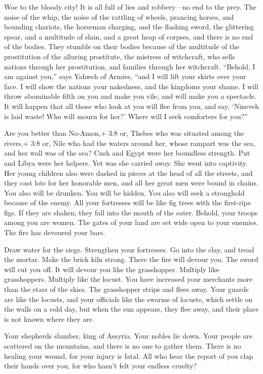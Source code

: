  Woe to the bloody city! It is all full of lies and
robbery---no end to the prey.  The noise of the whip, the
noise of the rattling of wheels, prancing horses, and bounding chariots,
 the horseman charging, and the flashing sword, the
glittering spear, and a multitude of slain, and a great heap of corpses,
and there is no end of the bodies. They stumble on their bodies
 because of the multitude of the prostitution of the
alluring prostitute, the mistress of witchcraft, who sells nations
through her prostitution, and families through her witchcraft.
 ``Behold, I am against you,'' says Yahweh of Armies, ``and
I will lift your skirts over your face. I will show the nations your
nakedness, and the kingdoms your shame.  I will throw
abominable filth on you and make you vile, and will make you a
spectacle.  It will happen that all those who look at you
will flee from you, and say, `Nineveh is laid waste! Who will mourn for
her?' Where will I seek comforters for you?''

 Are you better than No-Amon,+ 3:8 or, Thebes who was
situated among the rivers,+ 3:8 or, Nile who had the waters around her,
whose rampart was the sea, and her wall was of the sea? 
Cush and Egypt were her boundless strength. Put and Libya were her
helpers.  Yet was she carried away. She went into
captivity. Her young children also were dashed in pieces at the head of
all the streets, and they cast lots for her honorable men, and all her
great men were bound in chains.  You also will be drunken.
You will be hidden. You also will seek a stronghold because of the
enemy.  All your fortresses will be like fig trees with the
first-ripe figs. If they are shaken, they fall into the mouth of the
eater.  Behold, your troops among you are women. The gates
of your land are set wide open to your enemies. The fire has devoured
your bars.

 Draw water for the siege. Strengthen your fortresses. Go
into the clay, and tread the mortar. Make the brick kiln strong.
 There the fire will devour you. The sword will cut you
off. It will devour you like the grasshopper. Multiply like
grasshoppers. Multiply like the locust.  You have increased
your merchants more than the stars of the skies. The grasshopper strips
and flees away.  Your guards are like the locusts, and your
officials like the swarms of locusts, which settle on the walls on a
cold day, but when the sun appears, they flee away, and their place is
not known where they are.

 Your shepherds slumber, king of Assyria. Your nobles lie
down. Your people are scattered on the mountains, and there is no one to
gather them.  There is no healing your wound, for your
injury is fatal. All who hear the report of you clap their hands over
you, for who hasn't felt your endless cruelty?
